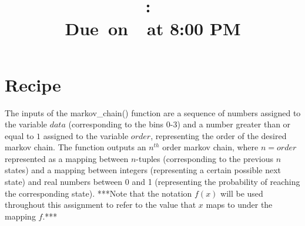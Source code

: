 \documentclass{article}
\title{
    \vspace{2in}
    \textmd{\textbf{\hmwkClass:\ \hmwkTitle}}\\
    \normalsize\vspace{0.1in}\small{Due\ on\ \hmwkDueDate\ at 8:00 PM}\\
    \vspace{0.1in}\large{\textit{\hmwkClassInstructor}}
    \vspace{3in}
}
\author{\hmwkAuthorName}
\date{}
\begin{document}
\maketitle
\pagebreak

\section{Recipe}
    
    The inputs of the markov\_chain() function are a sequence of numbers assigned to the variable $data$ (corresponding to the bins 0-3) and a number greater than or equal to $1$ assigned to the variable $order$, representing the order of the desired markov chain. The function outputs an $n^{th}$ order markov chain, where $n = order$ represented as a mapping between $n$-tuples (corresponding to the previous $n$ states) and a mapping between integers (representing a certain possible next state) and real numbers between 0 and 1 (representing the probability of reaching the corresponding state). ***Note that the notation $f(x)$ will be used throughout this assignment to refer to the value that $x$ maps to under the mapping $f$.***
    
\end{document}
